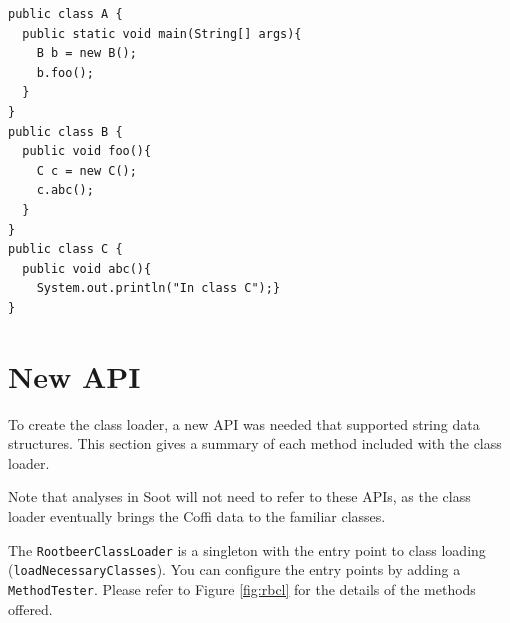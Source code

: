 \documentclass[preprint]{sigplanconf}
\begin{document}
\begin{lstlisting}[caption={Loaded Scene for Running example},label={lst:loadscenerunningexample},float=!ht]
public class A {
  public static void main(String[] args){
    B b = new B();
    b.foo();
  }
}
public class B {
  public void foo(){
    C c = new C();
    c.abc();
  }
}
public class C {
  public void abc(){
    System.out.println("In class C");}
}
\end{lstlisting}

\section{New API}
\label{sec:api}
To create the \rb class loader, a new API was needed that supported string data structures. This section gives a summary of each method included with the \rb class loader.

Note that analyses in Soot will not need to refer to these APIs, as the class loader eventually brings the Coffi data to the familiar classes.

The {\tt RootbeerClassLoader} is a singleton with the entry point to class loading ({\tt loadNecessaryClasses}). You can configure the entry points by adding a {\tt MethodTester}. Please refer to Figure \ref{fig:rbcl} for the details of the methods offered.
\end{document}
